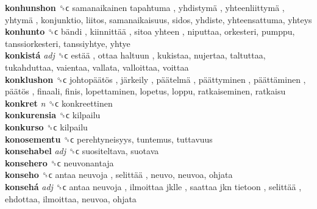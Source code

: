 \textbf{konhunshon} ␝ϲ   samanaikainen tapahtuma ,  yhdistymä ,  yhteenliittymä ,  yhtymä , konjunktio, liitos, samanaikaisuus, sidos, yhdiste, yhteensattuma, yhteys  \\
\textbf{konhunto} ␝ϲ   bändi ,  kiinnittää ,  sitoa yhteen , niputtaa, orkesteri, pumppu, tanssiorkesteri, tanssiyhtye, yhtye  \\
\textbf{konkistá} \emph{adj}  ␝ϲ   estää ,  ottaa haltuun , kukistaa, nujertaa, taltuttaa, tukahduttaa, vaientaa, vallata, valloittaa, voittaa  \\
\textbf{konklushon} ␝ϲ   johtopäätös ,  järkeily ,  päätelmä ,  päättyminen ,  päättäminen ,  päätös , finaali, finis, lopettaminen, lopetus, loppu, ratkaiseminen, ratkaisu  \\
\textbf{konkret} \emph{n}  ␝ϲ  konkreettinen  \\
\textbf{konkurensia} ␝ϲ  kilpailu  \\
\textbf{konkurso} ␝ϲ  kilpailu  \\
\textbf{konosementu} ␝ϲ  perehtyneisyys, tuntemus, tuttavuus  \\
\textbf{konsehabel} \emph{adj}  ␝ϲ  suositeltava, suotava  \\
\textbf{konsehero} ␝ϲ  neuvonantaja  \\
\textbf{konseho} ␝ϲ   antaa neuvoja ,  selittää , neuvo, neuvoa, ohjata  \\
\textbf{konsehá} \emph{adj}  ␝ϲ   antaa neuvoja ,  ilmoittaa jklle ,  saattaa jkn tietoon ,  selittää , ehdottaa, ilmoittaa, neuvoa, ohjata  \\
